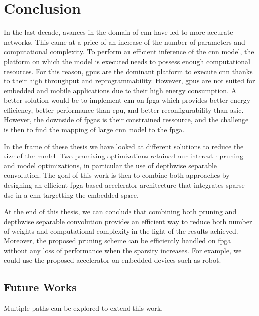 \chapter*{Conclusion}
%
In the last decade, avances in the domain of \acrshort{cnn} have led to more accurate networks. This came at a price of an increase of the number of parameters and computational complexity. To perform an efficient inference of the \acrshort{cnn} model, the platform on which the model is executed needs to possess enough computational resources. For this reason, \acrshort{gpu}s are the dominant platform to execute \acrshort{cnn} thanks to their high throughput and reprogrammability. However, \acrshort{gpu}s are not suited for embedded and mobile applications due to their high energy consumption. A better solution would be to implement \acrshort{cnn} on \acrshort{fpga} which provides better energy efficiency, better performance than \acrshort{cpu}, and better reconfigurability than \acrshort{asic}. However, the downside of \acrshort{fpga}s is their constrained ressource, and the challenge is then to find the mapping of large \acrshort{cnn} model to the \acrshort{fpga}.

In the frame of these thesis we have looked at different solutions to reduce the size of the model. Two promising optimizations retained our interest : pruning and model optimizations, in particular the use of depthwise separable convolution. The goal of this work is then to combine both approaches by designing an efficient \acrshort{fpga}-based accelerator architecture that integrates sparse \acrshort{dsc} in a \acrshort{cnn} targetting the embedded space.

At the end of this thesis, we can conclude that combining both pruning and depthwise separable convolution provides an efficient way to reduce both number of weights and computational complexity in the light of the results achieved. Moreover, the proposed pruning scheme can be efficiently handled on \acrshort{fpga} without any loss of performance when the sparsity increases. For example, we could use the proposed accelerator on embedded devices such as robot.
%
\section*{Future Works}
%
Multiple paths can be explored to extend this work.

